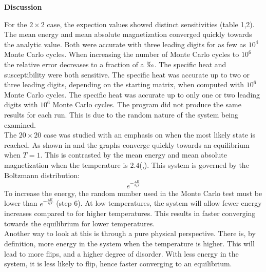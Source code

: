\documentclass[10pt,a4paper]{article}
\begin{document}
\newpage
{\LARGE\bf
Discussion 
}

\noindent For the $2 \times 2$ case, the expection values showed distinct sensitivities (table 1,2). The mean energy and mean absolute magnetization converged quickly towards the analytic value. Both were accurate with three leading digits for as few as $10^4$ Monte Carlo cycles. When increasing the number of Monte Carlo cycles to $10^6$ the relative error decreases to a fraction of a $\permil$. The specific heat and susceptibility were both sensitive. The specific heat was accurate up to two or three leading digits, depending on the starting matrix, when computed with $10^6$ Monte Carlo cycles. The specific heat was accurate up to only one or two leading digits with $10^6$ Monte Carlo cycles. The program did not produce the same results for each run. This is due to the random nature of the system being examined.\\

\noindent The $20 \times 20$ case was studied with an emphasis on when the most likely state is reached. As shown in  and  the graphs converge quickly towards an equilibrium when $T=1$. This is contrasted by the mean energy and mean absolute magnetization when the temperature is $2.4$(,). This system is governed by the Boltzmann distribution:
\begin{equation}
 e^{-\frac{\vartriangle E}{k_bT}}
\end{equation}
\noindent To increase the energy, the random number used in the Monte Carlo test must be lower than $e^{-\frac{\vartriangle E}{k_bT}}$  (step 6). At low temperatures, the system will allow fewer energy increases compared to for higher temperatures. This results in faster converging towards the equilibrium for lower temperatures.\\

\noindent Another way to look at this is through a pure physical perspective. There is, by definition, more energy in the system when the temperature is higher. This will lead to more flips, and a higher degree of disorder. With less energy in the system, it is less likely to flip, hence faster converging to an equilibrium.\\
\end{document}
